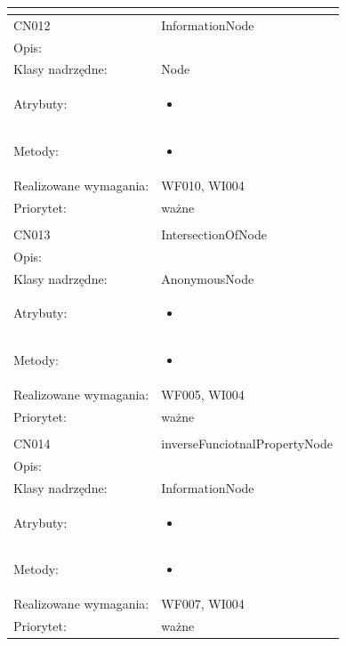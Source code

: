 \documentclass[a4paper,10pt]{article}
\begin{document}
\begin{center}
\begin{longtable}{|m{3cm}|m{9cm}|}
\multicolumn{2}{c}{} \\
 \hline

CN012 & InformationNode \\ \hline
Opis: &     \\ \hline
Klasy nadrzędne: & Node     \\ \hline
Atrybuty: & \begin{itemize}
 \item 
\end{itemize}
 \\ \hline
Metody: & \begin{itemize}
 \item 
\end{itemize}
  \\ \hline
Realizowane wymagania: & WF010, WI004 \\ \hline
Priorytet: & ważne  \\ \hline

\multicolumn{2}{c}{} \\
 \hline

CN013 & IntersectionOfNode \\ \hline
Opis: &     \\ \hline
Klasy nadrzędne: & AnonymousNode     \\ \hline
Atrybuty: & \begin{itemize}
 \item 
\end{itemize}
 \\ \hline
Metody: & \begin{itemize}
 \item 
\end{itemize}
  \\ \hline
Realizowane wymagania: & WF005, WI004 \\ \hline
Priorytet: & ważne  \\ \hline

\multicolumn{2}{c}{} \\
 \hline

CN014 & inverseFunciotnalPropertyNode \\ \hline
Opis: &     \\ \hline
Klasy nadrzędne: & InformationNode     \\ \hline
Atrybuty: & \begin{itemize}
 \item 
\end{itemize}
 \\ \hline
Metody: & \begin{itemize}
 \item 
\end{itemize}
  \\ \hline
Realizowane wymagania: & WF007, WI004 \\ \hline
Priorytet: & ważne  \\ \hline


\end{longtable}
\end{center}
\end{document}
